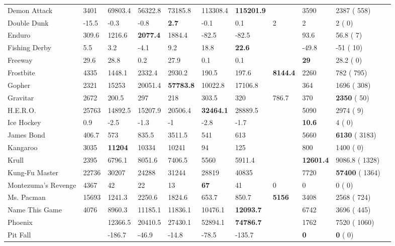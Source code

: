 \documentclass[sigconf,screen]{acmart}\settopmatter{printfolios=true,printacmref=false}
\begin{document}
\begin{table*}[t]
{\begin{tabular}{l l l l l l l l l l l}
Demon Attack & 3401 & 69803.4 & 56322.8 & 73185.8 & 113308.4 & \textbf{115201.9} &  & 3590 & 2387 {\tiny( 558)}\\
Double Dunk & -15.5 & -0.3 & -0.8 & \textbf{2.7} & -0.1 & 0.1 & 2 & 2 & 2 {\tiny( 0)}\\
Enduro & 309.6 & 1216.6 & \textbf{2077.4} & 1884.4 & -82.5 & -82.5 &  & 93.6 & 56.8 {\tiny( 7)}\\
Fishing Derby & 5.5 & 3.2 & -4.1 & 9.2 & 18.8 & \textbf{22.6} &  & -49.8 & -51 {\tiny( 10)}\\
Freeway & 29.6 & 28.8 & 0.2 & 27.9 & 0.1 & 0.1 &  & \textbf{29} & 28.2 {\tiny( 0)}\\
Frostbite & 4335 & 1448.1 & 2332.4 & 2930.2 & 190.5 & 197.6 & \textbf{8144.4} & 2260 & 782 {\tiny( 795)}\\
Gopher & 2321 & 15253 & 20051.4 & \textbf{57783.8} & 10022.8 & 17106.8 &  & 364 & 1696 {\tiny( 308)}\\
Gravitar & 2672 & 200.5 & 297 & 218 & 303.5 & 320 & 786.7 & 370 & \textbf{2350} {\tiny( 50)}\\
H.E.R.O. & 25763 & 14892.5 & 15207.9 & 20506.4 & \textbf{32464.1} & 28889.5 &  & 5090 & 2974 {\tiny( 9)}\\
Ice Hockey & 0.9 & -2.5 & -1.3 & -1 & -2.8 & -1.7 &  & \textbf{10.6} & 4 {\tiny( 0)}\\
James Bond & 406.7 & 573 & 835.5 & 3511.5 & 541 & 613 &  & 5660 & \textbf{6130} {\tiny( 3183)}\\
Kangaroo & 3035 & \textbf{11204} & 10334 & 10241 & 94 & 125 &  & 800 & 1400 {\tiny( 0)}\\
Krull & 2395 & 6796.1 & 8051.6 & 7406.5 & 5560 & 5911.4 &  & \textbf{12601.4} & 9086.8 {\tiny( 1328)}\\
Kung-Fu Master & 22736 & 30207 & 24288 & 31244 & 28819 & 40835 &  & 7720 & \textbf{57400} {\tiny( 1364)}\\
Montezuma’s Revenge & 4367 & 42 & 22 & 13 & \textbf{67} & 41 & 0 & 0 & 0 {\tiny( 0)}\\
Ms. Pacman & 15693 & 1241.3 & 2250.6 & 1824.6 & 653.7 & 850.7 & \textbf{5156} & 3408 & 2568 {\tiny( 724)}\\
Name This Game & 4076 & 8960.3 & 11185.1 & 11836.1 & 10476.1 & \textbf{12093.7} &  & 6742 & 3696 {\tiny( 445)}\\
Phoenix &  & 12366.5 & 20410.5 & 27430.1 & 52894.1 & \textbf{74786.7} &  & 1762 & 7520 {\tiny( 1060)}\\
Pit Fall &  & -186.7 & -46.9 & -14.8 & -78.5 & -135.7 &  & \textbf{0} & \textbf{0} {\tiny( 0)}\\

\end{tabular}}
\end{table*}
\end{document}
